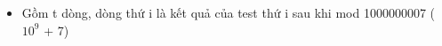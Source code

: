 \begin{itemize}
	\item     Gồm t dòng, dòng thứ i là kết quả của test thứ i sau khi mod 1000000007 ($10^{9}$    + 7)   
\end{itemize}